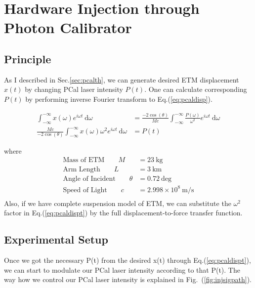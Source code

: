 
\chapter{Hardware Injection through Photon Calibrator}
\section{Principle}



 
 As I described in Sec.\ref{sec:pcalth}, we can generate desired ETM displacement $x(t)$ by changing PCal laser intensity $P(t)$. One can calculate corresponding $P(t)$ by performing inverse Fourier transform to Eq.(\ref{eq:pcaldisp}).
 
\begin{align}
    \int_{-\infty}^{-\infty} x(\omega) e^{i \omega t} ~\mathrm{d} \omega &= 
     \frac{-2   \cos(\theta)}{Mc} 
     \int_{-\infty}^{-\infty}\frac{P(\omega)}{\omega^2} e^{i \omega t} ~\mathrm{d} \omega \\
\label{eq:pcaldispt}
    \frac{Mc}{-2 \cos(\theta)} \int_{-\infty}^{-\infty}
     x(\omega) \omega^2 e^{i \omega t} ~\mathrm{d} \omega 
&= P(t) 
\end{align}

where
\begin{align*}
   \text{Mass of ETM} \qquad  M &= 23 ~\mathrm{kg} \\
   \text{Arm Length} \qquad   L &= 3 ~\mathrm{km}  \\
   \text{Angle of Incident} \qquad   \theta &= 0.72 ~\mathrm{deg}  \\
   \text{Speed of Light} \qquad   c &= 2.998\times10^8 ~\mathrm{m/s} \\
\end{align*}
Also, if we have complete suspension model of ETM, we can substitute the $\omega^2$ factor in Eq.(\ref{eq:pcaldispt}) by the full displacement-to-force transfer function.


\pagebreak
\section{Experimental Setup}

Once we got the necessary P(t) from the desired x(t) through Eq.(\ref{eq:pcaldispt}), we can start to modulate our PCal laser intensity according to that P(t). The way how we control our PCal laser intensity is explained in Fig.~(\ref{fig:injsigpath}).


